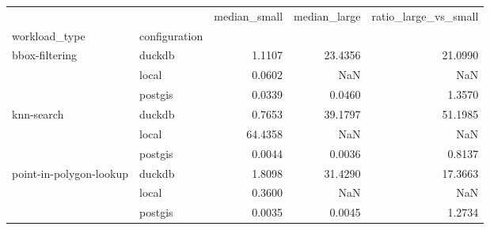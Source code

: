 \begin{tabular}{llrrr}
\toprule
 &  & median\_small & median\_large & ratio\_large\_vs\_small \\
workload\_type & configuration &  &  &  \\
\midrule
\multirow[t]{3}{*}{bbox-filtering} & duckdb & 1.1107 & 23.4356 & 21.0990 \\
 & local & 0.0602 & NaN & NaN \\
 & postgis & 0.0339 & 0.0460 & 1.3570 \\
\cline{1-5}
\multirow[t]{3}{*}{knn-search} & duckdb & 0.7653 & 39.1797 & 51.1985 \\
 & local & 64.4358 & NaN & NaN \\
 & postgis & 0.0044 & 0.0036 & 0.8137 \\
\cline{1-5}
\multirow[t]{3}{*}{point-in-polygon-lookup} & duckdb & 1.8098 & 31.4290 & 17.3663 \\
 & local & 0.3600 & NaN & NaN \\
 & postgis & 0.0035 & 0.0045 & 1.2734 \\
\cline{1-5}
\bottomrule
\end{tabular}

